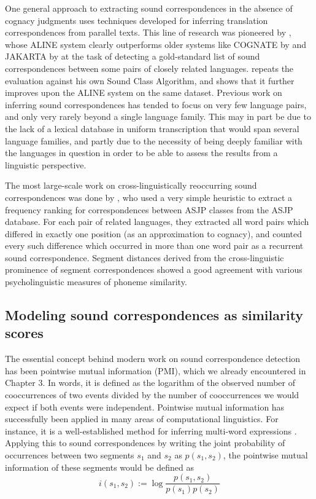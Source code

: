 One general approach to extracting sound correspondences in the absence of cognacy judgments uses techniques developed for inferring translation correspondences from parallel texts. This line of research was pioneered by \cite{kondrak2002}, whose ALINE system clearly outperforms older systems like COGNATE by \cite{guy1984} and JAKARTA by \cite{oakes2000} at the task of detecting a gold-standard list of sound correspondences between some pairs of closely related languages. \cite{list2014} repeats the evaluation against his own Sound Class Algorithm, and shows that it further improves upon the ALINE system on the same dataset. Previous work on inferring sound correspondences has tended to focus on very few language pairs, and only very rarely beyond a single language family. This may in part be due to the lack of a lexical database in uniform transcription that would span several language families, and partly due to the necessity of being deeply familiar with the languages in question in order to be able to 
assess the results from a linguistic perspective.

The most large-scale work on cross-linguistically reoccurring sound correspondences was done by \cite{brown_ea_2013}, who used a very simple heuristic to extract a frequency ranking for correspondences between ASJP classes from the ASJP database. For each pair of related languages, they extracted all word pairs which differed in exactly one position (as an approximation to cognacy), and counted every such difference which occurred in more than one word pair as a recurrent sound correspondence. Segment distances derived from the cross-linguistic prominence of segment correspondences showed a good agreement with various psycholinguistic measures of phoneme similarity.

\subsection{Modeling sound correspondences as similarity scores}
The essential concept behind modern work on sound correspondence detection has been pointwise mutual information (PMI), which we already encountered in Chapter 3. In words, it is defined as the logarithm of the observed number of cooccurrences of two events divided by the number of cooccurrences we would expect if both events were independent. Pointwise mutual information has successfully been applied in many areas of computational linguistics. For instance, it is a well-established method for inferring multi-word expressions \citep[e.g.][]{bouma2009}. Applying this to sound correspondences by writing the joint probability of occurrences between two segments $s_1$ and $s_2$ as $p(s_1,s_2)$, the pointwise mutual information of these segments would be defined as
\begin{equation}
 i(s_1,s_2) := \log \frac{p(s_1,s_2)}{p(s_1)p(s_2)}
\end{equation}

